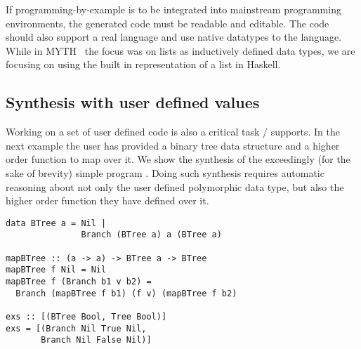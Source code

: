 If programming-by-example is to be integrated into mainstream programming environments, the generated code must be readable and editable.
The code should also support a real language and use native datatypes to the language.
While in MYTH~\cite{Osera:2015} the focus was on lists as inductively defined data types, we are focusing on using the built in representation of a list in Haskell.





\subsection{Synthesis with user defined values}

Working on a set of user defined code is also a critical task \ourTool/ supports. 
In the next example the user has provided a binary tree data structure and a higher order function to map over it. We show the synthesis of the exceedingly (for the sake of brevity) simple program .
Doing such synthesis requires automatic reasoning about not only the user defined polymorphic data type, but also the higher order function they have defined over it.

\begin{lstlisting}
data BTree a = Nil |
               Branch (BTree a) a (BTree a)

mapBTree :: (a -> a) -> BTree a -> BTree 
mapBTree f Nil = Nil
mapBTree f (Branch b1 v b2) = 
  Branch (mapBTree f b1) (f v) (mapBTree f b2)

exs :: [(BTree Bool, Tree Bool)]
exs = [(Branch Nil True Nil,
       Branch Nil False Nil)]
\end{lstlisting}

